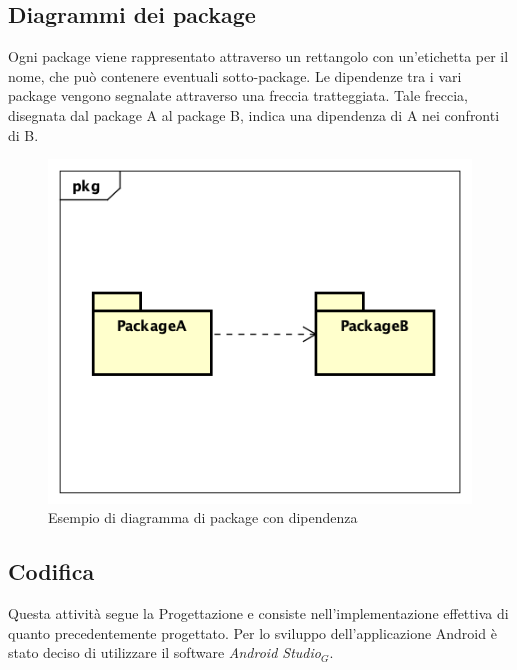 \subsection{Diagrammi dei package}
Ogni package viene rappresentato attraverso un rettangolo con un'etichetta per il nome, che può contenere eventuali sotto-package. Le dipendenze tra i vari package vengono segnalate attraverso una freccia tratteggiata. Tale freccia, disegnata dal package A al package B, indica una dipendenza di A nei confronti di B.
\begin{figure}[h]
	\centering
	\includegraphics[scale=0.5]{images/DiagrammaPackage.png}
	\caption{Esempio di diagramma di package con dipendenza}\label{}
\end{figure}


\subsection{Codifica}
Questa attività segue la Progettazione e consiste nell'implementazione effettiva di quanto precedentemente progettato. Per lo sviluppo dell'applicazione Android è stato deciso di utilizzare il software \textit{Android Studio$_{G}$}.
